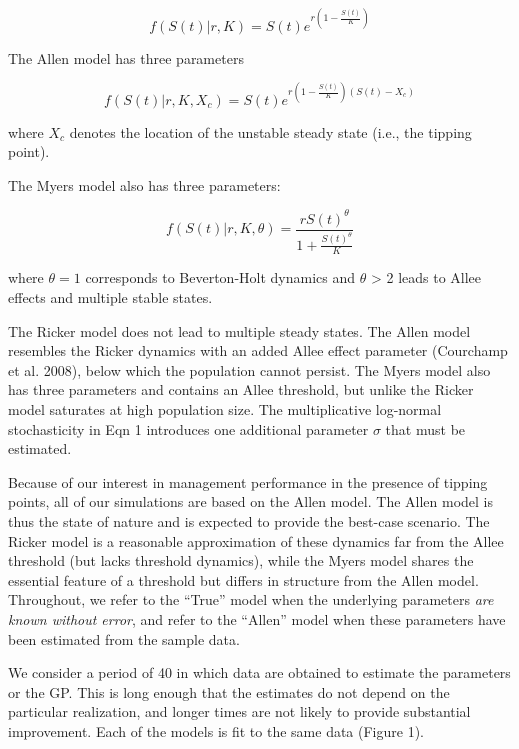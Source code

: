 \documentclass[author-year, 12pt,review]{components/elsarticle} %
\begin{document}
\begin{equation}
f(S(t)|r,K) = S(t) e^{r \left(1 - \frac{S(t)}{K} \right) } \label{ricker}
\end{equation}

The Allen model has three parameters

\begin{equation}
f(S(t)|r, K, X_c) = S(t) e^{r \left(1 - \frac{S(t)}{K}\right)\left(S(t) - X_c\right)} \label{allen}
\end{equation}

where $X_c$ denotes the location of the unstable steady state (i.e., the
tipping point).

The Myers model also has three parameters:

\begin{equation}
f(S(t) | r, K, \theta)  = \frac{r S(t)^{\theta}}{1 + \frac{S(t)^\theta}{K}} \label{myers}
\end{equation}

where $\theta = 1$ corresponds to Beverton-Holt dynamics and $\theta$
\textgreater{} 2 leads to Allee effects and multiple stable states.

The Ricker model does not lead to multiple steady states. The Allen
model resembles the Ricker dynamics with an added Allee effect parameter
(Courchamp et al. 2008), below which the population cannot persist. The
Myers model also has three parameters and contains an Allee threshold,
but unlike the Ricker model saturates at high population size. The
multiplicative log-normal stochasticity in Eqn 1 introduces one
additional parameter $\sigma$ that must be estimated.

Because of our interest in management performance in the presence of
tipping points, all of our simulations are based on the Allen model. The
Allen model is thus the state of nature and is expected to provide the
best-case scenario. The Ricker model is a reasonable approximation of
these dynamics far from the Allee threshold (but lacks threshold
dynamics), while the Myers model shares the essential feature of a
threshold but differs in structure from the Allen model. Throughout, we
refer to the ``True'' model when the underlying parameters \emph{are
known without error}, and refer to the ``Allen'' model when these
parameters have been estimated from the sample data.

We consider a period of 40 in which data are obtained to estimate the
parameters or the GP. This is long enough that the estimates do not
depend on the particular realization, and longer times are not likely to
provide substantial improvement. Each of the models is fit to the same
data (Figure 1).
\end{document}
